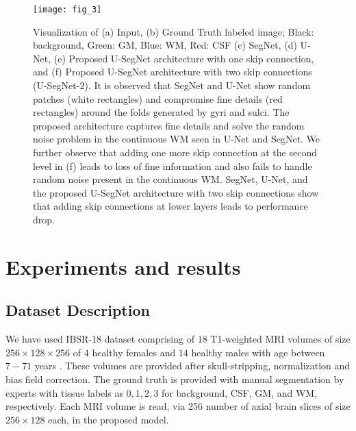 \documentclass{article}
\begin{document}
\begin{figure*}[t]
	\begin{center}		\texttt{[image: fig\_3]}
		\end{center}
	\vspace{-2em}
	\caption{Visualization of (a) Input, (b) Ground Truth labeled image; Black: background, Green: GM, Blue: WM, Red: CSF (c) SegNet, (d) U-Net, (e) Proposed U-SegNet architecture with one skip connection, and (f) Proposed U-SegNet architecture with two skip connections (U-SegNet-2). It is observed that SegNet and U-Net show random patches (white rectangles) and compromise fine details (red rectangles) around the folds generated by gyri and sulci. The proposed architecture captures fine details and solve the random noise problem in the continuous WM seen in U-Net and SegNet. We further observe that adding one more skip connection at the second level in (f) leads to loss of fine information and also fails to handle random noise present in the continuous WM. SegNet, U-Net, and the proposed U-SegNet architecture with two skip connections show that adding skip connections at lower layers leads to performance drop.}
\label{fig:all_brain}
\end{figure*}

\section{Experiments and results}

\subsection{Dataset Description}

We have used IBSR-18 dataset comprising of $18$ T1-weighted MRI volumes of size $256\times128\times256$ of $4$ healthy females and $14$ healthy males with age between $7-71$ years \cite{IBSR_dataset}. These volumes are provided after skull-stripping, normalization and bias field correction. The ground truth is provided with manual segmentation by experts with tissue labels as $0, 1, 2, 3$ for background, CSF, GM, and WM, respectively. Each MRI volume is read, via 256 number of axial brain slices of size $256\times128$ each, in the proposed model.
\end{document}
